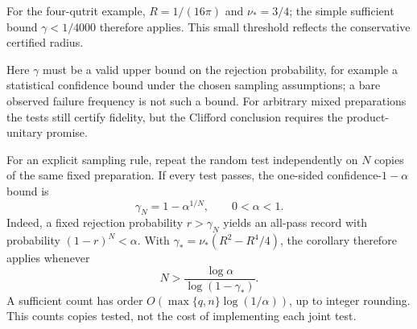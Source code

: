 For the four-qutrit example, \(R=1/(16\pi)\) and \(\nu_*=3/4\);
the simple sufficient bound \(\gamma<1/4000\) therefore applies.
This small threshold reflects the conservative certified radius.

Here \(\gamma\) must be a valid upper bound on the rejection probability,
for example a statistical confidence bound under the chosen sampling
assumptions; a bare observed failure frequency is not such a bound.
For arbitrary mixed preparations the tests still certify fidelity, but
the Clifford conclusion requires the product-unitary promise.

For an explicit sampling rule, repeat the random test independently on
\(N\) copies of the same fixed preparation.  If every test passes, the
one-sided confidence-\(1-\alpha\) bound is
\[
 \gamma_N=1-\alpha^{1/N},\qquad 0<\alpha<1.
\]
Indeed, a fixed rejection probability \(r>\gamma_N\) yields an all-pass
record with probability \((1-r)^N<\alpha\).  With
\(\gamma_*=\nu_*(R^2-R^4/4)\), the corollary therefore applies whenever
\[
 N>\frac{\log\alpha}{\log(1-\gamma_*)}.
\]
A sufficient count has order
\(O(\max\{q,n\}\log(1/\alpha))\), up to integer rounding.
This counts copies tested, not the cost of implementing each joint test.
